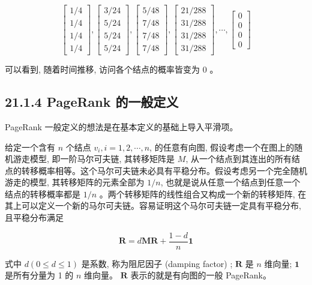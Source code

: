 \documentclass[10pt]{article}
\begin{document}
\begin{CJK*}{UTF8}{bsmi}
$$
\left[\begin{array}{l}
1 / 4 \\
1 / 4 \\
1 / 4 \\
1 / 4
\end{array}\right],\left[\begin{array}{l}
3 / 24 \\
5 / 24 \\
5 / 24 \\
5 / 24
\end{array}\right],\left[\begin{array}{l}
5 / 48 \\
7 / 48 \\
7 / 48 \\
7 / 48
\end{array}\right],\left[\begin{array}{l}
21 / 288 \\
31 / 288 \\
31 / 288 \\
31 / 288
\end{array}\right], \cdots,\left[\begin{array}{l}
0 \\
0 \\
0 \\
0
\end{array}\right]
$$

可以看到, 随着时间推移, 访问各个结点的概率皆变为 0 。

\subsection*{21.1.4 PageRank 的一般定义}
PageRank 一般定义的想法是在基本定义的基础上导入平滑项。

给定一个含有 $n$ 个结点 $v_{i}, i=1,2, \cdots, n$, 的任意有向图, 假设考虑一个在图上的随机游走模型, 即一阶马尔可夫链, 其转移矩阵是 $M$, 从一个结点到其连出的所有结点的转移概率相等。这个马尔可夫链未必具有平稳分布。假设考虑另一个完全随机游走的模型, 其转移矩阵的元素全部为 $1 / n$, 也就是说从任意一个结点到任意一个结点的转移概率都是 $1 / n$ 。两个转移矩阵的线性组合又构成一个新的转移矩阵, 在其上可以定义一个新的马尔可夫链。容易证明这个马尔可夫链一定具有平稳分布, 且平稳分布满足


\begin{equation*}
\boldsymbol{R}=d \boldsymbol{M} \boldsymbol{R}+\frac{1-d}{n} \boldsymbol{1} \tag{21.10}
\end{equation*}


式中 $d(0 \leqslant d \leqslant 1)$ 是系数, 称为阻尼因子 (damping factor) ; $\boldsymbol{R}$ 是 $n$ 维向量; $\boldsymbol{1}$ 是所有分量为 1 的 $n$ 维向量。 $\boldsymbol{R}$ 表示的就是有向图的一般 PageRank。


\end{CJK*}
\end{document}
